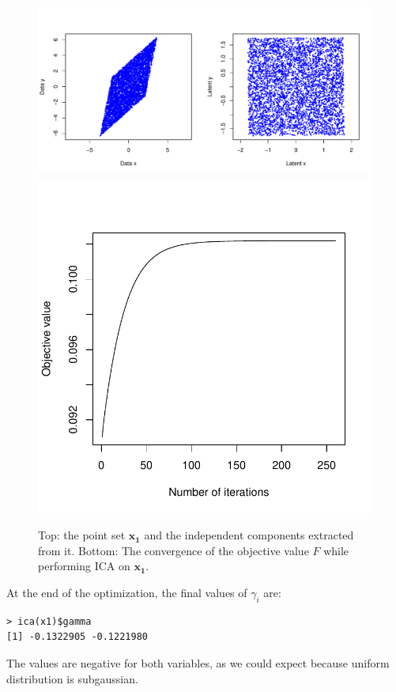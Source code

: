 \documentclass{article}
\renewcommand\vec[1]{\ensuremath{\mathbf{#1}}}
\begin{document}
\begin{figure}\centering
	\includegraphics[scale=0.6]{icatest}
	\includegraphics[scale=0.6]{icaobj}
	\caption{Top: the point set \vec{x_1} and the independent components extracted from it.
	Bottom: The convergence of the objective value $F$ while performing ICA on \vec{x_1}.}\label{fig:icatest}
\end{figure}

At the end of the optimization, the final values of $\gamma_i$ are:
\begin{verbatim}
> ica(x1)$gamma
[1] -0.1322905 -0.1221980
\end{verbatim}
The values are negative for both variables, as we could expect because uniform distribution is subgaussian.
\end{document}
